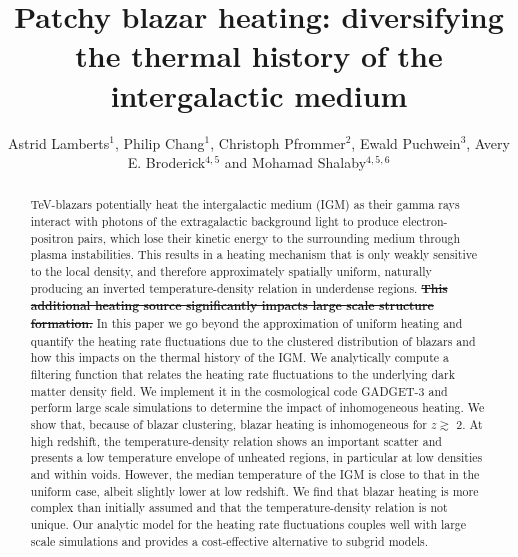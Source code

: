 \documentclass[numberedappendix]{emulateapj}
\newcommand\Ec[1]{{\color{magenta} \bf #1}} %
\begin{document}
\title{Patchy blazar heating: diversifying the thermal history of the intergalactic medium}
\author{Astrid Lamberts$^1$, Philip Chang$^1$,  Christoph Pfrommer$^2$, Ewald Puchwein$^3$, Avery E. Broderick$^{4,5}$ and Mohamad Shalaby$^{4,5,6}$}
\begin{abstract}
TeV-blazars potentially heat the intergalactic medium (IGM) as their gamma rays interact with photons of the extragalactic background light to produce electron-positron pairs, which lose their kinetic energy to the surrounding medium through plasma instabilities. This results in a heating mechanism that is only weakly sensitive to the local density, and therefore approximately spatially uniform, naturally  producing an inverted temperature-density relation in underdense regions. \Ec{\sout{This additional heating source significantly impacts large scale structure formation.}} In this paper we go beyond the approximation of uniform heating and quantify the heating rate fluctuations due to the clustered distribution of blazars and how this impacts on the thermal history of the IGM. We analytically compute a filtering function that relates the heating rate fluctuations to the underlying dark matter density field. We implement it in the cosmological code GADGET-3 and perform large scale simulations to determine the impact of inhomogeneous heating. We show that, because of blazar clustering, blazar heating is inhomogeneous  for $z\gtrsim$ 2. At high redshift, the temperature-density relation shows an important scatter and presents a low temperature envelope of unheated regions, in particular at low densities and within voids. However, the median temperature of the IGM is close to that in the uniform case, albeit slightly lower at low redshift. We find that blazar heating is more complex than initially assumed and that the temperature-density relation is not unique. Our analytic model for the heating rate fluctuations couples well with large scale simulations and provides a cost-effective alternative to subgrid models.
\end{abstract}
\end{document}
